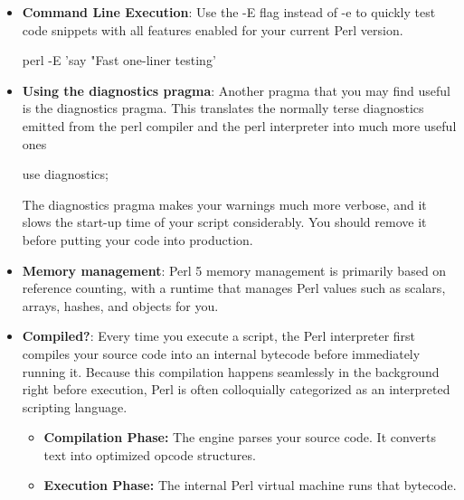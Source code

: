 \documentclass{report}
\begin{document}
\begin{itemize}
\begin{itemize}
                    \bigbreak \noindent 
                    \begin{perlcode}
                        use feature ':5.36'
                    \end{perlcode}
                \item \textbf{Implicit loading}: Requiring a minimum Perl version automatically enables the feature bundle for that version
            \end{itemize}
        \item \textbf{Command Line Execution}:  Use the -E flag instead of -e to quickly test code snippets with all features enabled for your current Perl version.
            \bigbreak \noindent 
            \begin{perlcode}
                perl -E 'say "Fast one-liner testing'
            \end{perlcode}
        \item \textbf{Using the diagnostics pragma}: Another pragma that you may find useful is the diagnostics pragma. This translates the normally terse diagnostics emitted from the perl compiler and the perl interpreter into much more useful ones
            \bigbreak \noindent 
            \begin{perlcode}
                use diagnostics;
            \end{perlcode}
            \bigbreak \noindent 
            The diagnostics pragma makes your warnings much more verbose, and it slows the start-up time of your script considerably. You should remove it before putting your code into production.
        \item \textbf{Memory management}: Perl 5 memory management is primarily based on reference counting, with a runtime that manages Perl values such as scalars, arrays, hashes, and objects for you.
        \item \textbf{Compiled?}:  Every time you execute a script, the Perl interpreter first compiles your source code into an internal bytecode before immediately running it. Because this compilation happens seamlessly in the background right before execution, Perl is often colloquially categorized as an interpreted scripting language.
            \begin{itemize}
                \item \textbf{Compilation Phase:} The engine parses your source code. It converts text into optimized opcode structures.
                \item \textbf{Execution Phase:} The internal Perl virtual machine runs that bytecode.

\end{itemize}
\end{itemize}
\end{document}
